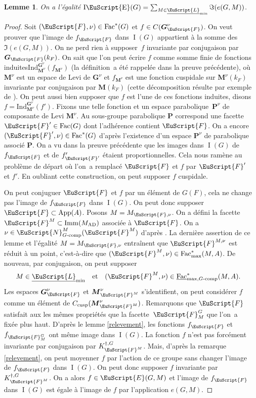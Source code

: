 \documentclass[JEP,XML,SOM,Unicode,francais]{cedram}
\let\mathcal \EuScript
\newcommand{\quadet}{\quad\text{et}\quad}
\newcommand{\AD}{\mathrm{AD}}
\newcommand{\App}{\mathrm{App}}
\newcommand{\tcomp}{\textup{-comp}}
\newcommand{\cusp}{\mathrm{cusp}}
\newcommand{\Fac}{\mathrm{Fac}}
\newcommand{\Imm}{\mathrm{Imm}}
\newcommand{\Ind}{\mathrm{Ind}}
\DeclareMathOperator{\rI}{I}
\DeclareMathOperator{\rIE}{I\cE}
\newcommand{\bG}{\boldsymbol{G}}
\newcommand{\bM}{\boldsymbol{M}}
\newcommand{\bP}{\boldsymbol{P}}
\newcommand{\cE}{\mathcal{E}}
\newcommand{\cF}{\mathcal{F}}
\newcommand{\cL}{\mathcal{L}}
\newcommand{\cN}{\mathcal{N}}
\theoremstyle{plain}
\newtheorem*{lem*}{Lemme}
\theoremstyle{definition}
\begin{document}
\begin{lem*}
On a l'égalité $\rIE(G)=\sum_{M\in \underline{\cL}_{\min}}\Im(e(G,M))$.
\end{lem*}

\begin{proof}
Soit $(\cF,\nu)\in \Fac^*(G)$ et $f\in C(\bG_{\cF}^{\nu})$. On veut prouver que l'image de $f_{\cF}$ dans $\rI(G)$ appartient à la somme des $\Im(e(G,M))$. On ne perd rien à supposer~$f$ invariante par conjugaison par $\bG_{\cF}(k_{F})$. On sait que l'on peut écrire $f$ comme somme finie de fonctions \og induites\fg $\Ind_{\bM^{\nu}}^{\bG^{\nu}}(f_{\bM^{\nu}})$ (la définition~a été rappelée dans la preuve précédente), où $\bM^{\nu}$ est un espace de Levi de $\bG^{\nu}$ et $f_{\bM^{\nu}}$ est une fonction cuspidale sur $\bM^{\nu}(k_{F})$ invariante par conjugaison par $\bM(k_{F})$ (cette décomposition résulte par exemple de \cite[Th.\,2.11]{A}). On peut aussi bien supposer que $f$ est l'une de ces fonctions induites, disons $f=\Ind_{\bM^{\nu}}^{\bG^{\nu}}(f')$. Fixons une telle fonction et un espace parabolique~$\bP^{\nu}$ de composante de Levi $\bM^{\nu}$. Au sous-groupe parabolique $\bP$ correspond une facette $\cF'\in \Fac(G)$ dont l'adhérence contient $\cF$. On a encore $(\cF',\nu)\in \Fac^*(G)$ d'après l'existence d'un espace $\bP^{\nu}$ de parabolique associé $\bP$. On a vu dans la preuve précédente que les images dans $\rI(G)$ de $f_{\cF}$ et de $f'_{\cF'}$ étaient proportionnelles.
Cela nous ramène au problème de départ où l'on~a remplacé $\cF$ et $f$ par $\cF'$ et $f'$. En oubliant cette construction, on peut supposer $f$ cuspidale.

On peut conjuguer $\cF$ et $f$ par un élément de $G(F)$, cela ne change pas l'image de $f_{\cF}$ dans $\rI(G)$. On peut donc supposer $\cF\subset \App(A)$. Posons $M=M_{\cF,\nu}$. On a défini la facette $\cF^M\subset \Imm(M_{\AD})$ associée à $\cF$. On a $\nu\in \cN_{G\tcomp}^M(\cF^M)$ d'après \cite[Lem.\,6(i)]{W2}. La dernière assertion de ce lemme et l'égalité $M=M_{\cF,\nu}$ entraînent que $\cF^{M,\nu}$ est réduit à un point, c'est-à-dire que $(\cF^M,\nu)\in \Fac^*_{\max}(M,A)$. De nouveau, par conjugaison, on peut supposer
\[
M\in \underline{\cL}_{\min}\quadet (\cF^M,\nu)\in \underline{\Fac}^*_{\max,G\tcomp}(M,A).
\]
Les espaces $\bG_{\cF}^{\nu}$ et $\bM_{\cF^M}^{\nu}$ s'identifient, on peut considérer $f$ comme un élément de $C_{\cusp}(\bM_{\cF^M}^{\nu})$. Remarquons que $\cF$ satisfait aux les mêmes propriétés que la facette~$\cF_{M}^G$ que l'on~a fixée plus haut. D'après le lemme \ref{relevement}, les fonctions $f_{\cF}$ et $f_{\cF_{M}^G}$ ont même image dans $\rI(G)$. La fonction $f$ n'est pas forcément invariante par
conjugaison par $K_{\cF^M}^{\dag,G}$. Mais, d'après la remarque \ref{relevement}, on peut moyenner $f$ par l'action de ce groupe sans changer l'image de $f_{\cF}$ dans $\rI(G)$. On peut donc supposer $f$ invariante par $K_{\cF^M}^{\dag,G}$. On a alors $f\in \cE(G,M)$ et l'image de $f_{\cF}$ dans $\rI(G)$ est égale à l'image de $f$ par l'application $e(G,M)$.
\end{proof}
\end{document}
